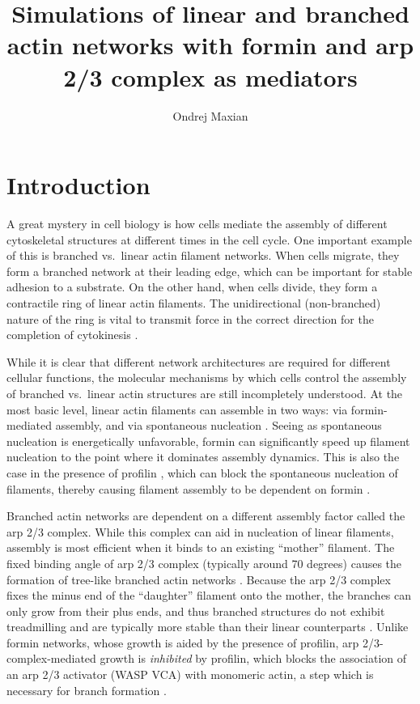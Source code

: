 \documentclass[11pt]{article}
\title{Simulations of linear and branched actin networks with formin and arp 2/3 complex as mediators  \vspace{-0.5 cm}}
\author{Ondrej Maxian  \vspace{-0.75 cm}}
\begin{document}
\maketitle

\section{Introduction} 
A great mystery in cell biology is how cells mediate the assembly of different cytoskeletal structures at different times in the cell cycle. One important example of this is branched vs.\ linear actin filament networks. When cells migrate, they form a branched network at their leading edge, which can be important for stable adhesion to a substrate. On the other hand, when cells divide, they form a contractile ring of linear actin filaments. The unidirectional (non-branched) nature of the ring is vital to transmit force in the correct direction for the completion of cytokinesis \cite{alberts}. 

While it is clear that different network architectures are required for different cellular functions, the molecular mechanisms by which cells control the assembly of branched vs.\ linear actin structures are still incompletely understood. At the most basic level, linear actin filaments can assemble in two ways: via formin-mediated assembly, and via spontaneous nucleation \cite{alberts, pollard2007regulation}. Seeing as spontaneous nucleation is energetically unfavorable, formin can significantly speed up filament nucleation \cite{rosenbloom2021mechanism} to the point where it dominates assembly dynamics. This is also the case in the presence of profilin \cite{schutt1993structure}, which can block the spontaneous nucleation of filaments, thereby causing filament assembly to be dependent on formin \cite{alberts, pollard1984quantitative}. 

Branched actin networks are dependent on a different assembly factor called the arp 2/3 complex. While this complex can aid in nucleation of linear filaments, assembly is most efficient when it binds to an existing ``mother'' filament. The fixed binding angle of arp 2/3 complex (typically around 70 degrees) causes the formation of tree-like branched actin networks \cite{pollard2007regulation, alberts}. Because the arp 2/3 complex fixes the minus end of the ``daughter'' filament onto the mother, the branches can only grow from their plus ends, and thus branched structures do not exhibit treadmilling and are typically more stable than their linear counterparts \cite{alberts, ni2019turnover, liman2020role}. Unlike formin networks, whose growth is aided by the presence of profilin, arp 2/3-complex-mediated growth is \emph{inhibited} by profilin, which blocks the association of an arp 2/3 activator (WASP VCA) with monomeric actin, a step which is necessary for branch formation \cite{suarez2015profilin}. 
\end{document}
